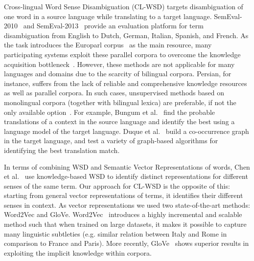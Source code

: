 Cross-lingual Word Sense Disambiguation (CL-WSD) targets disambiguation of one word in a source language while translating to a target language. SemEval-2010~\cite{lefever2010semeval} and SemEval-2013~\cite{lefever2013semeval} provide an evaluation platform for term disambiguation  from English to Dutch, German, Italian, Spanish, and French. %
As the task introduces the Europarl corpus~\cite{europarl} as the main resource, many participating systems exploit these parallel corpora to overcome the knowledge acquisition bottleneck~\cite{lefever2011parasense,rudnick2013hltdi}. However, these methods are not applicable for many languages and domains due to the scarcity of bilingual corpora. Persian, for instance, suffers from the lack of reliable and comprehensive knowledge resources as well as parallel corpora. In such cases, unsupervised methods based on monolingual corpora (together with bilingual lexica) are preferable, if not the only available option~\cite{sofianopoulos2012implementing}. %
For example, Bungum et al.~ find the probable translations of a context in the source language and identify the best using a language model of the target language. Duque et al.~ build a co-occurrence graph in the target language, and test a variety of graph-based algorithms for identifying the best translation match.

In terms of combining WSD and Semantic Vector Representations of words, Chen et al.~ use knowledge-based WSD to identify distinct representations for different senses of the same term. Our approach for CL-WSD is the opposite of this: starting from general vector representations of terms, it identifies their different senses in context. %
As vector representations we used two state-of-the-art methods: Word2Vec and GloVe. Word2Vec~\cite{mikolov2013efficient} introduces a highly incremental and scalable method such that when trained on large datasets, it makes it possible to capture many linguistic subtleties (e.g. similar relation between Italy and Rome in comparison to France and Paris). More recently, GloVe~\cite{pennington2014glove} shows superior results in exploiting the implicit knowledge within corpora. 

